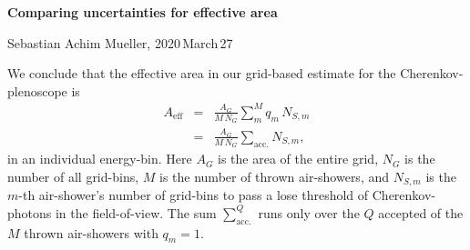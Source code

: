 \documentclass[a4paper,12pt,oneside]{article}
\begin{document}
%
\noindent
%
\LARGE
\textbf{Comparing uncertainties for effective area}
\normalsize\\
%
\begin{center}
Sebastian Achim Mueller, 2020\,March\,27
\end{center}
%
We conclude that the effective area in our grid-based estimate for the Cherenkov-plenoscope is
%
\begin{eqnarray*}
A_\text{eff} &=& \frac{A_G}{M\,N_G} \sum_m^M q_m\,N_{S,m}\\
&=&\frac{A_G}{M\,N_G} \sum_\text{acc.}N_{S,m},
\end{eqnarray*}
%
in an individual energy-bin.
%
Here $A_G$ is the area of the entire grid, $N_G$ is the number of all grid-bins, $M$ is the number of thrown air-showers, and $N_{S,m}$ is the $m$-th air-shower's number of grid-bins to pass a lose threshold of Cherenkov-photons in the field-of-view.
%
The sum $\sum_\text{acc.}^Q$ runs only over the $Q$ accepted of the $M$ thrown air-showers with $q_m = 1$.
%
\end{document}

